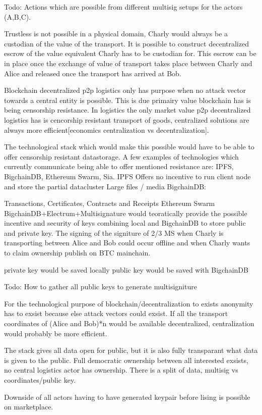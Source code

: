 \documentclass[Nomencl]{DylanMaster}
\begin{document}
Todo: Actions which are possible from different multisig setups for the actors (A,B,C).

Trustless is not possible in a physical domain, Charly would always be a custodian of the value of the transport. It is possible to construct decentralized escrow of the value equivalent Charly has to be custodian for. This escrow can be in place once the exchange of value of transport takes place between Charly and Alice and released once the transport has arrived at Bob.

Blockchain decentralized p2p logistics only has purpose when no attack vector towards a central entity is possible. This is due primairy value blockchain has is being censorship resistance. In logistics the only market value p2p decentralized logistics has is cencorship resistant transport of goods, centralized solutions are always more efficient[economics centralization vs decentralization].

The technological stack which would make this possible would have to be able to offer censorship resistant datastorage. A few examples of technologies which currently communicate being able to offer mentioned resistance are: IPFS, BigchainDB, Ethereum Swarm, Sia.
IPFS
Offers no incentive to run client node and store the partial datacluster
Large files / media
BigchainDB:

Transactions, Certificates, Contracts and Receipts
Ethereum Swarm
BigchainDB+Electrum+Multisignature would teoratically provide the possible incentive and security of keys combining local and BigchainDB to store public and private key. The signing of the signiture of 2/3 MS when Charly is transporting between Alice and Bob could occur offline and when Charly wants to claim ownership publish on BTC mainchain.

private key would be saved locally
public key would be saved with BigchainDB

Todo: How to gather all public keys to generate multisigniture

For the technological purpose of blockchain/decentralization to exists anonymity has to exsist because else attack vectors could exsist. If all the transport coordinates of (Alice and Bob)*n would be available decentralized, centralization would probably be more efficient.

The stack gives all data open for public, but it is also fully transparant what data is given to the public. Full democratic ownership between all interested exsists, no central logistics actor has ownership. There is a split of data, multisig vs coordinates/public key.

Downside of all actors having to have generated keypair before lising is possible on marketplace.



\end{document}

